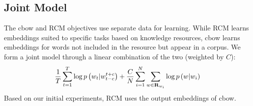 \documentclass[11pt]{article}
\begin{document}
\subsection{Joint Model}
\label{ssec:train_joint}
The cbow and RCM objectives use separate data %
for learning. While RCM learns
embeddings suited to specific tasks based on knowledge resources, cbow learns embeddings for words
not included in the resource but appear in a corpus. We form a joint model through a linear combination of the two (weighted
by $C$):%
\vspace{-.2cm}
\begin{equation}
\small
 \frac{1}{T} \sum_{t=1}^{T} \log p\left( w_t | w_{t-c}^{t+c} \right) 
 + \frac{C}{N} \sum_{i=1}^{N} \sum_{w \in \mathbf{R}_{w_i} } \log p\left( w | w_i \right) \nonumber
\end{equation}
Based on our initial experiments, RCM uses the output embeddings of cbow.
\end{document}
